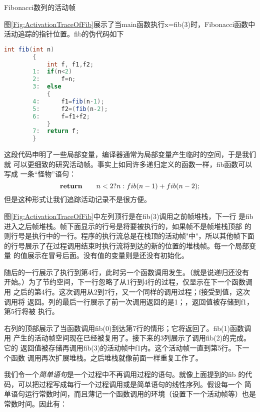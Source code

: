 \begin{example}\label{Example:3_1ActivationFrames}
Fibonacci数列的活动帧

图\ref{Fig:ActivationTraceOfFib}展示了当main函数执行x=fib(3)时，Fibonacci函数中
活动追踪的指针位置。fib的伪代码如下

\begin{lstlisting}[language={Java}, keywordstyle=\color{blue!70}, commentstyle=\color{red!50!green!50!blue!50}]
        int fib(int n)
        {
            int f, f1,f2;
        1:  if(n<2)
        2:      f=n;
        3:  else
            {
        4:      f1=fib(n-1);
        5:      f2=(fib(n-2);
        6:      f=f1+f2;
            }
        7:  return f;
        }
\end{lstlisting}

这段代码申明了一些局部变量，编译器通常为局部变量产生临时的空间，于是我们就
可以更细致的研究活动帧。事实上如同许多递归定义的函数一样，fib函数可以写成
一条“怪物”语句：
\begin{displaymath}
\mbox{\textbf{return}}\qquad n<2?n:fib(n-1)+fib(n-2);
\end{displaymath}
但是这种形式让我们追踪活动记录不是很方便。

图\ref{Fig:ActivationTraceOfFib}中左列顶行是在fib(3)调用之前帧堆栈，下一行
是fib进入之后帧堆栈。帧下面显示的行号是将要被执行的，如果帧不是帧堆栈顶部
的则行号是执行中的一行。程序的执行流总是在栈顶的活动帧"中"，所以其他帧下面
的行号展示了在过程调用结束时执行流将到达的新的位置的堆栈帧。每一个局部变量
的值展示在冒号后面。没有值的变量则是还没有初始化。

随后的一行展示了执行到第4行，此时另一个函数调用发生。（就是说递归还没有
开始。）为了节约空间，下一行忽略了从1行到4行的过程，仅显示在下一个函数调用
之后的第4行。这次调用从2到7行，又一个同样的调用过程；f接受到值，这次调用将
返回。列的最后一行展示了前一次调用返回的是1；，返回值被存储到f1，第5行将被
执行。

右列的顶部展示了当函数调用fib(0)到达第7行的情形；它将返回了。fib(1)函数调用
产生的活动帧空间现在已经被复用了。接下来的3列展示了调用fib(2)的完成。它的
返回值被存储再调用fib(3)的活动帧中f1内。这个活动帧一直到第5行。下一个函数
调用再次扩展堆栈。之后堆栈就像前面一样重复工作了。

\end{example}

我们令一个\emph{简单语句}是一个过程中不再调用过程的语句。就像上面提到的fib
的代码，可以把过程写成每行一个过程调用或是简单语句的线性序列。假设每一个
简单语句运行常数时间，而且薄记一个函数调用的环境（设置下一个活动帧等）也是
常数时间。因此有：


